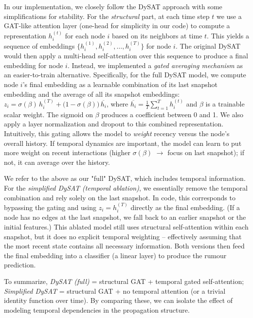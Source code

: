 \documentclass{cshonours}
\begin{document}
In our implementation, we closely follow the DySAT approach with some simplifications for stability. For the \emph{structural} part, at each time step $t$ we use a GAT-like attention layer (one-head for simplicity in our code) to compute a representation $h_i^{(t)}$ for each node $i$ based on its neighbors at time $t$. This yields a sequence of embeddings $\{h_i^{(1)}, h_i^{(2)}, \dots, h_i^{(T)}\}$ for node $i$. The original DySAT would then apply a multi-head self-attention over this sequence to produce a final embedding for node $i$. Instead, we implemented a \emph{gated averaging mechanism} as an easier-to-train alternative. Specifically, for the full DySAT model, we compute node $i$'s final embedding as a learnable combination of its last snapshot embedding and the average of all its snapshot embeddings: $z_i = \sigma(\beta)\, h_i^{(T)} + \big(1-\sigma(\beta)\big)\, \overline{h_i}$, where $\overline{h_i} = \frac{1}{T}\sum_{t=1}^T h_i^{(t)}$ and $\beta$ is a trainable scalar weight. The sigmoid on $\beta$ produces a coefficient between 0 and 1. We also apply a layer normalization and dropout to this combined representation. Intuitively, this gating allows the model to \emph{weight} recency versus the node's overall history. If temporal dynamics are important, the model can learn to put more weight on recent interactions (higher $\sigma(\beta)$ $\rightarrow$ focus on last snapshot); if not, it can average over the history.

We refer to the above as our "full" DySAT, which includes temporal information. For the \emph{simplified DySAT (temporal ablation)}, we essentially remove the temporal combination and rely solely on the last snapshot. In code, this corresponds to bypassing the gating and using $z_i = h_i^{(T)}$ directly as the final embedding. (If a node has no edges at the last snapshot, we fall back to an earlier snapshot or the initial features.) This ablated model still uses structural self-attention within each snapshot, but it does no explicit temporal weighting – effectively assuming that the most recent state contains all necessary information. Both versions then feed the final embedding into a classifier (a linear layer) to produce the rumour prediction.

To summarize, \emph{DySAT (full)} = structural GAT + temporal gated self-attention; \emph{Simplified DySAT} = structural GAT + no temporal attention (or a trivial identity function over time). By comparing these, we can isolate the effect of modeling temporal dependencies in the propagation structure.
\end{document}
